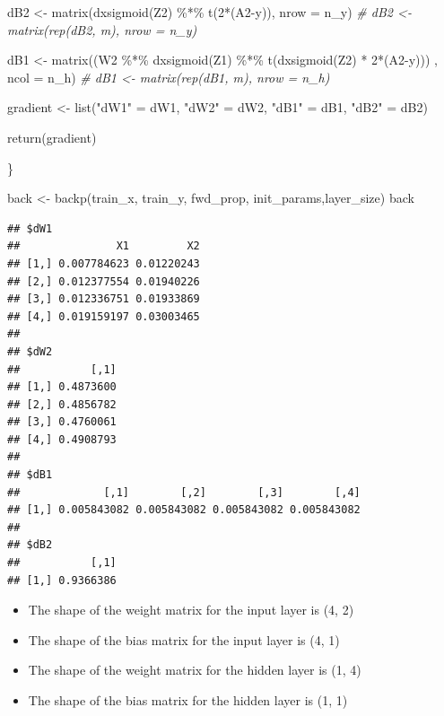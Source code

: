 \documentclass[
]{article}
\newenvironment{Shaded}{\begin{snugshade}}{\end{snugshade}}
\newcommand{\AttributeTok}[1]{\textcolor[rgb]{0.77,0.63,0.00}{#1}}
\newcommand{\CommentTok}[1]{\textcolor[rgb]{0.56,0.35,0.01}{\textit{#1}}}
\newcommand{\DecValTok}[1]{\textcolor[rgb]{0.00,0.00,0.81}{#1}}
\newcommand{\FunctionTok}[1]{\textcolor[rgb]{0.00,0.00,0.00}{#1}}
\newcommand{\NormalTok}[1]{#1}
\newcommand{\OtherTok}[1]{\textcolor[rgb]{0.56,0.35,0.01}{#1}}
\newcommand{\SpecialCharTok}[1]{\textcolor[rgb]{0.00,0.00,0.00}{#1}}
\newcommand{\StringTok}[1]{\textcolor[rgb]{0.31,0.60,0.02}{#1}}
\providecommand{\tightlist}{%
  \setlength{\itemsep}{0pt}\setlength{\parskip}{0pt}}
\begin{document}
\begin{Shaded}
\begin{Highlighting}[]
\NormalTok{  dB2 }\OtherTok{\textless{}{-}} \FunctionTok{matrix}\NormalTok{(}\FunctionTok{dxsigmoid}\NormalTok{(Z2) }\SpecialCharTok{\%*\%} \FunctionTok{t}\NormalTok{(}\DecValTok{2}\SpecialCharTok{*}\NormalTok{(A2}\SpecialCharTok{{-}}\NormalTok{y)), }\AttributeTok{nrow =}\NormalTok{ n\_y)}
\CommentTok{\#  dB2 \textless{}{-} matrix(rep(dB2, m), nrow = n\_y) }
  
\NormalTok{  dB1 }\OtherTok{\textless{}{-}} \FunctionTok{matrix}\NormalTok{((W2 }\SpecialCharTok{\%*\%} \FunctionTok{dxsigmoid}\NormalTok{(Z1) }\SpecialCharTok{\%*\%} \FunctionTok{t}\NormalTok{(}\FunctionTok{dxsigmoid}\NormalTok{(Z2) }\SpecialCharTok{*} \DecValTok{2}\SpecialCharTok{*}\NormalTok{(A2}\SpecialCharTok{{-}}\NormalTok{y))) , }\AttributeTok{ncol =}\NormalTok{ n\_h)}
\CommentTok{\#  dB1 \textless{}{-} matrix(rep(dB1, m), nrow = n\_h)}
  
\NormalTok{    gradient }\OtherTok{\textless{}{-}} \FunctionTok{list}\NormalTok{(}\StringTok{"dW1"} \OtherTok{=}\NormalTok{ dW1,}
                     \StringTok{"dW2"} \OtherTok{=}\NormalTok{ dW2,}
                     \StringTok{"dB1"} \OtherTok{=}\NormalTok{ dB1,}
                     \StringTok{"dB2"} \OtherTok{=}\NormalTok{ dB2)}
  
  \FunctionTok{return}\NormalTok{(gradient)}
    
\NormalTok{\}}

\NormalTok{back }\OtherTok{\textless{}{-}} \FunctionTok{backp}\NormalTok{(train\_x, train\_y, fwd\_prop, init\_params,layer\_size)}
\NormalTok{back}
\end{Highlighting}
\end{Shaded}

\begin{verbatim}
## $dW1
##               X1         X2
## [1,] 0.007784623 0.01220243
## [2,] 0.012377554 0.01940226
## [3,] 0.012336751 0.01933869
## [4,] 0.019159197 0.03003465
## 
## $dW2
##           [,1]
## [1,] 0.4873600
## [2,] 0.4856782
## [3,] 0.4760061
## [4,] 0.4908793
## 
## $dB1
##             [,1]        [,2]        [,3]        [,4]
## [1,] 0.005843082 0.005843082 0.005843082 0.005843082
## 
## $dB2
##           [,1]
## [1,] 0.9366386
\end{verbatim}

\begin{itemize}
\tightlist
\item
  The shape of the weight matrix for the input layer is (4, 2)
\item
  The shape of the bias matrix for the input layer is (4, 1)
\item
  The shape of the weight matrix for the hidden layer is (1, 4)
\item
  The shape of the bias matrix for the hidden layer is (1, 1)
\end{itemize}
\end{document}
